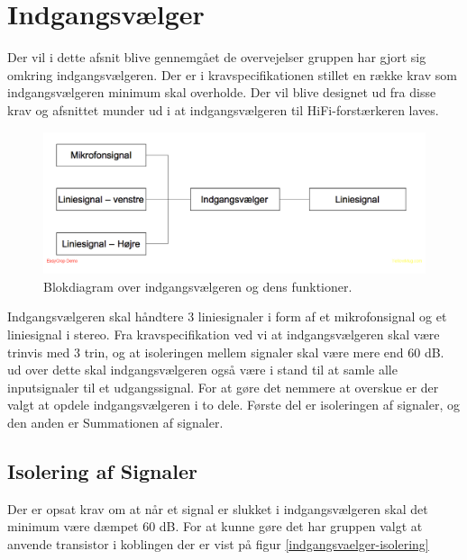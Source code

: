\section{Indgangsvælger}
\label{indgangsvaelger}
Der vil i dette afsnit blive gennemgået de overvejelser gruppen har gjort sig omkring indgangsvælgeren. Der er i kravspecifikationen stillet en række krav som indgangsvælgeren minimum skal overholde. Der vil blive designet ud fra disse krav og afsnittet munder ud i at indgangsvælgeren til HiFi-forstærkeren laves.

\begin{figure}[h]
\centering
\includegraphics[scale=0.4]{implementering/indgangsvaelger/overordnetdesign.png}
\caption{Blokdiagram over indgangsvælgeren og dens funktioner.}
\label{indgangsvaelger-overordnet}
\end{figure}

Indgangsvælgeren skal håndtere 3 liniesignaler i form af et mikrofonsignal og et liniesignal i stereo. Fra kravspecifikation ved vi at indgangsvælgeren skal være trinvis med 3 trin, og at isoleringen mellem signaler skal være mere end 60 dB. ud over dette skal indgangsvælgeren også være i stand til at samle alle inputsignaler til et udgangssignal. For at gøre det nemmere at overskue er der valgt at opdele indgangsvælgeren i to dele. Første del er isoleringen af signaler, og den anden er Summationen af signaler.

\subsection*{Isolering af Signaler}
Der er opsat krav om at når et signal er slukket i indgangsvælgeren skal det minimum være dæmpet 60 dB. For at kunne gøre det har gruppen valgt at anvende transistor i koblingen der er vist på figur \ref{indgangsvaelger-isolering}

